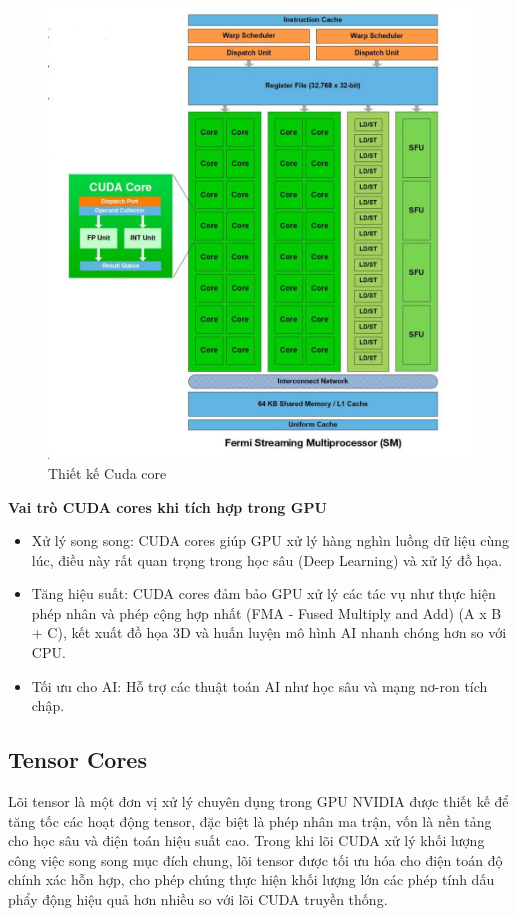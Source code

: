 \documentclass[a4paper]{article}
\begin{document}
\begin{figure}
    \centering
    \includegraphics[width=0.75\linewidth]{assets/gpu11.png}
    \caption{Thiết kế Cuda core}
    \label{fig:enter-label}
\end{figure}
    
\textbf{Vai trò CUDA cores khi tích hợp trong GPU}
\begin{itemize}
    \item Xử lý song song: CUDA cores giúp GPU xử lý hàng nghìn luồng dữ liệu cùng lúc,
    điều này rất quan trọng trong học sâu (Deep Learning) và xử lý đồ họa.
    \item Tăng hiệu suất: CUDA cores đảm bảo GPU xử lý các tác vụ như thực hiện phép nhân và phép cộng hợp nhất (FMA - Fused Multiply and Add) (A x B + C), kết xuất đồ họa 3D và huấn luyện mô hình AI nhanh chóng hơn so với CPU.
    \item Tối ưu cho AI: Hỗ trợ các thuật toán AI như học sâu và mạng nơ-ron tích chập.
\end{itemize}
\subsection{Tensor Cores}
Lõi tensor là một đơn vị xử lý chuyên dụng trong GPU NVIDIA được thiết kế để tăng tốc các hoạt động tensor, đặc biệt là phép nhân ma trận, vốn là nền tảng cho học sâu và điện toán hiệu suất cao. Trong khi lõi CUDA xử lý khối lượng công việc song song mục đích chung, lõi tensor được tối ưu hóa cho điện toán độ chính xác hỗn hợp, cho phép chúng thực hiện khối lượng lớn các phép tính dấu phẩy động hiệu quả hơn nhiều so với lõi CUDA truyền thống.
\end{document}
